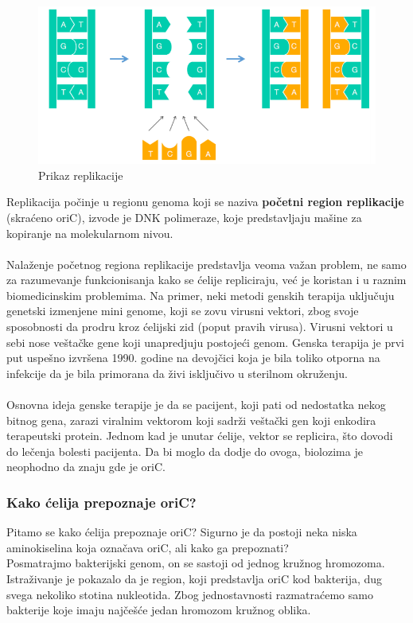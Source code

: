 \begin{figure}[h]
\caption{Prikaz replikacije}
\centering
\includegraphics[width=1\textwidth]{poglavlja/1/slike/Replikacija.png}
\end{figure} 

Replikacija počinje u regionu genoma koji se naziva \textbf{početni region replikacije} (skraćeno oriC), izvode je DNK polimeraze, koje predstavljaju mašine za kopiranje na molekularnom nivou.\\\\
Nalaženje početnog regiona replikacije predstavlja veoma važan problem, ne samo za razumevanje funkcionisanja kako se ćelije repliciraju, već je koristan i u raznim biomedicinskim problemima. Na primer, neki metodi genskih terapija uključuju genetski izmenjene mini genome, koji se zovu virusni vektori, zbog svoje sposobnosti da prodru kroz ćelijski zid (poput pravih virusa). Virusni vektori u sebi nose veštačke gene koji unapredjuju postojeći genom. Genska terapija je prvi put uspešno izvršena 1990. godine na devojčici koja je bila toliko otporna na infekcije da je bila primorana da živi isključivo u sterilnom okruženju.\\\\
Osnovna ideja genske terapije je da se pacijent, koji pati od nedostatka nekog bitnog gena, zarazi viralnim vektorom koji sadrži veštački gen koji enkodira terapeutski protein. Jednom kad je unutar ćelije, vektor se replicira, što dovodi do lečenja bolesti pacijenta. Da bi moglo da dodje do ovoga, biolozima je neophodno da znaju gde je oriC.

\subsubsection{Kako ćelija prepoznaje oriC?}
Pitamo se kako ćelija prepoznaje oriC? Sigurno je da postoji neka niska aminokiselina koja označava oriC, ali kako ga prepoznati?\\
Posmatrajmo bakterijski genom, on se sastoji od jednog kružnog hromozoma. Istraživanje je pokazalo da je region, koji predstavlja oriC kod bakterija,
dug svega nekoliko stotina nukleotida. Zbog jednostavnosti razmatraćemo samo bakterije koje imaju najčešće jedan hromozom kružnog oblika.\\

